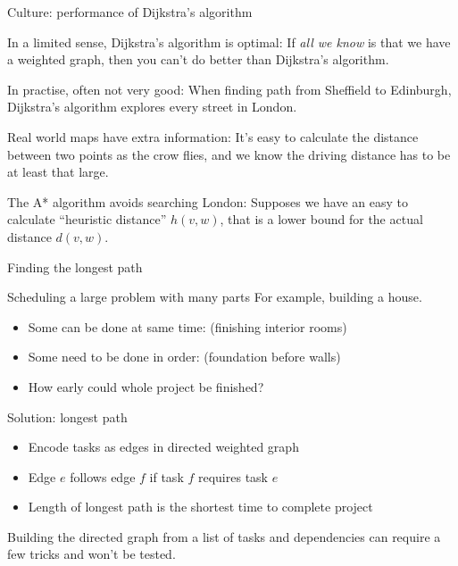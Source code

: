 \documentclass{beamer}
\begin{document}
\begin{frame}{Culture: performance of Dijkstra's algorithm}
  \begin{block}{In a limited sense, Dijkstra's algorithm is optimal:}
If \emph{all we know} is that we have a weighted graph, then you can't do better than Dijkstra's algorithm.
    \end{block}
  \begin{block}{In practise, often not very good:}
 When finding path from Sheffield to Edinburgh, Dijkstra's algorithm explores every street in London.
  \end{block}
  \begin{block}{Real world maps have extra information:}
    It's easy to calculate the distance between two points as the crow flies, and we know the driving distance has to be at least that large.  
\end{block}  
  \begin{block}{The A* algorithm avoids searching London:}
    Supposes we have an easy to calculate ``heuristic distance'' $h(v,w)$, that is a lower bound for the actual distance $d(v,w)$. 
    \end{block}
\end{frame}


\begin{frame}{Finding the longest path}
  \begin{block}{Scheduling a large problem with many parts}
For example, building a house.
    \begin{itemize}
    \item Some can be done at same time: (finishing interior rooms)
    \item Some need to be done in order: (foundation before walls)
    \item How early could whole project be finished?
    \end{itemize}
  \end{block}
  \begin{block}{Solution: longest path}
    \begin{itemize}
    \item  Encode tasks as edges in directed weighted graph        
    \item Edge $e$ follows edge $f$ if task $f$ requires task $e$ 
    \item Length of longest path is the shortest time to complete project 
    \end{itemize}
\end{block}
Building the directed graph from a list of tasks and dependencies can require a few tricks and won't be tested.

\end{frame}
\end{document}
